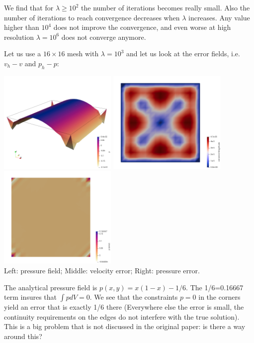 We find that for $\lambda \ge 10^2$ the number of iterations becomes really small.
Also the number of iterations to reach convergence decreases when $\lambda$ increases. 
Any value higher than $10^4$ does not improve the convergence, and even worse
at high resolution $\lambda=10^6$ does not converge anymore. 

Let us use a $16\times 16$ mesh with $\lambda=10^3$ and let us look at the error fields, 
i.e. $v_h-v$ and $p_h-p$:
\begin{center}
\includegraphics[width=5.7cm]{python_codes/fieldstone_161/results/bench1/press2}
\includegraphics[width=5.7cm]{python_codes/fieldstone_161/results/bench1/vel_error}
\includegraphics[width=5.7cm]{python_codes/fieldstone_161/results/bench1/press_error}\\
{\captionfont Left: pressure field; Middle: velocity error; Right: pressure error.} 
\end{center}
The analytical pressure field is $p(x,y)=x(1-x)-1/6$. The 1/6=0.16667 term insures that $\int p dV=0$.
We see that the constraints $p=0$ in the corners yield an error that is exactly 1/6 there 
(Everywhere else the error is small, the continuity requirements on the edges do not interfere 
with the true solution). 
{\color{red} This is a big problem that is not discussed in the original paper: is there a way around this?}

